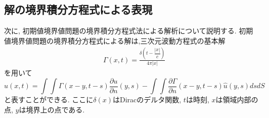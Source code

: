 \documentclass[dvipdfmx]{ampbt}
\begin{document}
\subsection{解の境界積分方程式による表現}
次に, 初期値境界値問題の境界積分方程式法による解析について説明する.
初期値境界値問題の境界積分方程式による解は,三次元波動方程式の基本解
\begin{align}
&\Gamma(x,t) = \displaystyle \frac{\delta(t-\dfrac{|x|}{c})}{4\pi|x|}
\end{align}
を用いて
\begin{equation}
  \label{eq:境界積分方程式}
u(x,t) = \int\!\!\!\int \Gamma(x-y,t-s) \frac{\partial u}{\partial n}(y,s) - \int\!\!\!\int \frac{\partial \Gamma}{\partial n}(x-y,t-s) \hat{u}(y,s) ds dS
\end{equation}
と表すことができる.
ここに$\delta(x)$はDiracのデルタ関数,
$t$は時刻,
$x$は領域内部の点,
$y$は境界上の点である.
\end{document}
